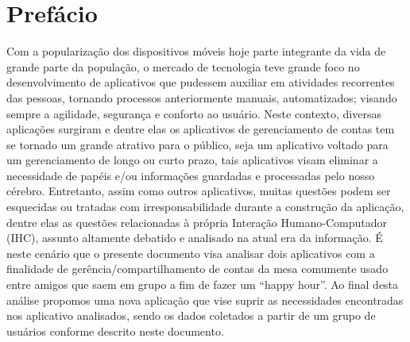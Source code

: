 \chapter*[Prefácio]{Prefácio}

Com a popularização dos dispositivos móveis hoje parte integrante da vida de grande parte da população, o mercado de tecnologia teve grande foco no desenvolvimento de aplicativos que pudessem auxiliar em atividades recorrentes das pessoas, tornando processos anteriormente manuais, automatizados; visando sempre a agilidade, segurança e conforto ao usuário.
Neste contexto, diversas aplicações surgiram e dentre elas os aplicativos de gerenciamento de contas tem se tornado um grande atrativo para o público, seja um aplicativo voltado para um gerenciamento de longo ou curto prazo, tais aplicativos visam eliminar a necessidade de papéis e/ou informações guardadas e processadas pelo nosso cérebro.
Entretanto, assim como outros aplicativos, muitas questões podem ser esquecidas ou tratadas com irresponsabilidade durante a construção da aplicação, dentre elas as questões relacionadas à própria Interação Humano-Computador (IHC), assunto altamente debatido e analisado na atual era da informação.
É neste cenário que o presente documento visa analisar dois aplicativos com a finalidade de gerência/compartilhamento de contas da mesa comumente usado entre amigos que saem em grupo a fim de fazer um “happy hour”. Ao final desta análise propomos uma nova aplicação que vise suprir as necessidades encontradas nos aplicativo analisados, sendo os dados coletados a partir de um grupo de usuários conforme descrito neste documento.